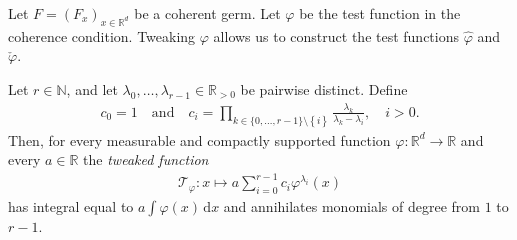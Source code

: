Let \( F = (F_x)_{x \in \mathbb{R}^d} \) be a coherent germ. Let \( \varphi \) be the test function in the coherence condition. {Tweaking} \(\varphi\) allows us to construct the test functions \(\hat \varphi\) and \(\check \varphi\).

\begin{lemma}[Tweaking]\label{tweaking-lemma}
    Let \(r \in \mathbb{N}\), and let \(\lambda_0, \ldots,\lambda_{r-1} \in \mathbb{R}_{>0}\) be pairwise distinct. Define 
    \begin{align*}
        c_0 = 1 \quad \text{and} \quad 
        c_i = \prod_{k \in \{0, \ldots,r-1\} \setminus\left\{ i \right\} } \frac{\lambda_k}{\lambda_k - \lambda_i}, \quad i > 0.
    \end{align*}
    Then, for every measurable and compactly supported function \(\varphi: \mathbb{R}^d \to \mathbb{R}\) and every \(a \in \mathbb{R}\) the \emph{tweaked function}  
    \begin{align*}
        \mathcal{T}_{\varphi}: x \mapsto a\sum^{r-1}_{i=0}c_i\varphi^{\lambda_i}(x)
    \end{align*}
    has integral equal to \(a \int \varphi(x) \, \mathrm{d}x\) and annihilates monomials of degree from \(1\) to \(r-1\).
\end{lemma}

